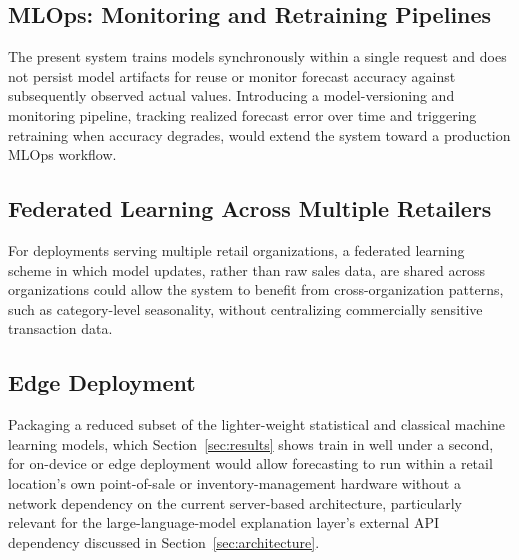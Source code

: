 \subsection{MLOps: Monitoring and Retraining Pipelines}
The present system trains models synchronously within a single request and does not persist model artifacts for reuse or monitor forecast accuracy against subsequently observed actual values. Introducing a model-versioning and monitoring pipeline, tracking realized forecast error over time and triggering retraining when accuracy degrades, would extend the system toward a production MLOps workflow.

\subsection{Federated Learning Across Multiple Retailers}
For deployments serving multiple retail organizations, a federated learning scheme in which model updates, rather than raw sales data, are shared across organizations could allow the system to benefit from cross-organization patterns, such as category-level seasonality, without centralizing commercially sensitive transaction data.

\subsection{Edge Deployment}
Packaging a reduced subset of the lighter-weight statistical and classical machine learning models, which Section~\ref{sec:results} shows train in well under a second, for on-device or edge deployment would allow forecasting to run within a retail location's own point-of-sale or inventory-management hardware without a network dependency on the current server-based architecture, particularly relevant for the large-language-model explanation layer's external API dependency discussed in Section~\ref{sec:architecture}.
